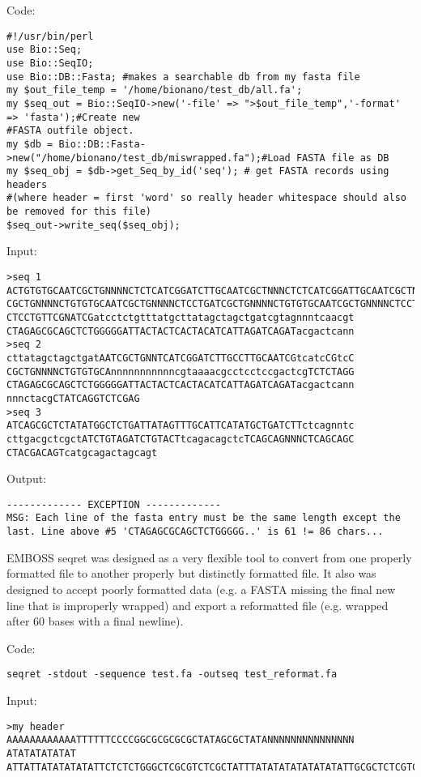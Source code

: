 Code:
\begin{verbatim}
#!/usr/bin/perl
use Bio::Seq;
use Bio::SeqIO;
use Bio::DB::Fasta; #makes a searchable db from my fasta file
my $out_file_temp = '/home/bionano/test_db/all.fa';
my $seq_out = Bio::SeqIO->new('-file' => ">$out_file_temp",'-format' => 'fasta');#Create new 
#FASTA outfile object.
my $db = Bio::DB::Fasta->new("/home/bionano/test_db/miswrapped.fa");#Load FASTA file as DB
my $seq_obj = $db->get_Seq_by_id('seq'); # get FASTA records using headers 
#(where header = first 'word' so really header whitespace should also be removed for this file)
$seq_out->write_seq($seq_obj);
\end{verbatim}

Input: 
\begin{verbatim}
>seq 1
ACTGTGTGCAATCGCTGNNNNCTCTCATCGGATCTTGCAATCGCTNNNCTCTCATCGGATTGCAATCGCTNNNCTtcatcCGGAT
CGCTGNNNNCTGTGTGCAATCGCTGNNNNCTCCTGATCGCTGNNNNCTGTGTGCAATCGCTGNNNNCTCCTGCAATCGCTGNNNN
CTCCTGTTCGNATCGatcctctgtttatgcttatagctagctgatcgtagnnntcaacgt
CTAGAGCGCAGCTCTGGGGGATTACTACTCACTACATCATTAGATCAGATacgactcann
>seq 2
cttatagctagctgatAATCGCTGNNTCATCGGATCTTGCCTTGCAATCGtcatcCGtcC
CGCTGNNNNCTGTGTGCAnnnnnnnnnnncgtaaaacgcctcctccgactcgTCTCTAGG
CTAGAGCGCAGCTCTGGGGGATTACTACTCACTACATCATTAGATCAGATacgactcann
nnnctacgCTATCAGGTCTCGAG
>seq 3
ATCAGCGCTCTATATGGCTCTGATTATAGTTTGCATTCATATGCTGATCTTctcagnntc
cttgacgctcgctATCTGTAGATCTGTACTtcagacagctcTCAGCAGNNNCTCAGCAGC
CTACGACAGTcatgcagactagcagt
\end{verbatim}

Output:
\begin{verbatim}
------------- EXCEPTION -------------
MSG: Each line of the fasta entry must be the same length except the last. Line above #5 'CTAGAGCGCAGCTCTGGGGG..' is 61 != 86 chars...
\end{verbatim}

EMBOSS seqret was designed as a very flexible tool to convert from one properly formatted file to another properly but distinctly formatted file. It also was designed to accept poorly formatted data (e.g. a FASTA missing the final new line that is improperly wrapped) and export a reformatted file (e.g. wrapped after 60 bases with a final newline).

Code:

\begin{verbatim}
seqret -stdout -sequence test.fa -outseq test_reformat.fa
\end{verbatim}

Input:

\begin{verbatim}
>my header
AAAAAAAAAAAATTTTTTCCCCGGCGCGCGCGCTATAGCGCTATANNNNNNNNNNNNNNN
ATATATATATAT
ATTATTATATATATATTCTCTCTGGGCTCGCGTCTCGCTATTTATATATATATATATATTGCGCTCTCGTCTCCT\end{verbatim}

